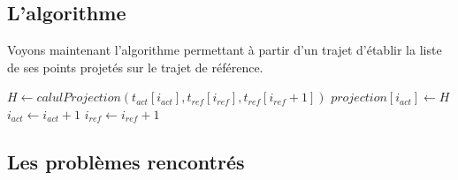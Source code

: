 \subsection{L'algorithme}
Voyons maintenant l'algorithme permettant à partir d'un trajet d'établir la liste de ses points projetés sur le trajet de référence.
\begin{algorithmic}
	\State $H \gets calulProjection(t_{act}[i_{act}],t_{ref}[i_{ref}],t_{ref}[i_{ref}+1])$
    	\State $projection[i_{act}]\gets H$
    	\State $i_{act}\gets i_{act}+1$
   	\Else
   		\State $i_{ref}\gets i_{ref}+1$
    \EndIf

\EndWhile
\EndFunction
\end{algorithmic}
\subsection{Les problèmes rencontrés}
